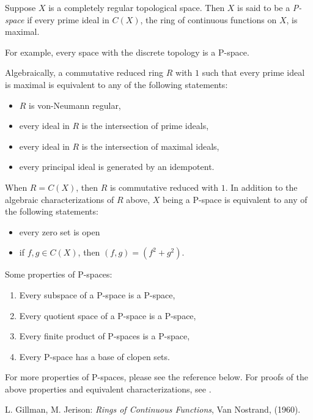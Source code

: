 \documentclass[12pt]{article}
\begin{document}
Suppose $X$ is a completely regular topological space.  Then $X$ is said to be a \emph{P-space} if every prime ideal in $C(X)$, the ring of continuous functions on $X$, is maximal.

For example, every space with the discrete topology is a P-space.

Algebraically, a commutative reduced ring $R$ with $1$ such that every prime ideal is maximal is equivalent to any of the following statements:
\begin{itemize}
\item $R$ is von-Neumann regular,
\item every ideal in $R$ is the intersection of prime ideals,
\item every ideal in $R$ is the intersection of maximal ideals,
\item every principal ideal is generated by an idempotent.
\end{itemize}

When $R=C(X)$, then $R$ is commutative reduced with $1$.  In addition to the algebraic characterizations of $R$ above, $X$ being a P-space is equivalent to any of the following statements:
\begin{itemize}
\item every zero set is open
\item if $f,g\in C(X)$, then $(f,g)=(f^2+g^2)$.
\end{itemize}

Some properties of P-spaces:
\begin{enumerate}
\item Every subspace of a P-space is a P-space,
\item Every quotient space of a P-space is a P-space,
\item Every finite product of P-spaces is a P-space,
\item Every P-space has a base of clopen sets.
\end{enumerate}

For more properties of P-spaces, please see the reference below.  For proofs of the above properties and equivalent characterizations, see .

\begin{thebibliography}{7}
 L. Gillman, M. Jerison: {\em Rings of Continuous Functions}, Van Nostrand, (1960).
\end{thebibliography}
\end{document}
